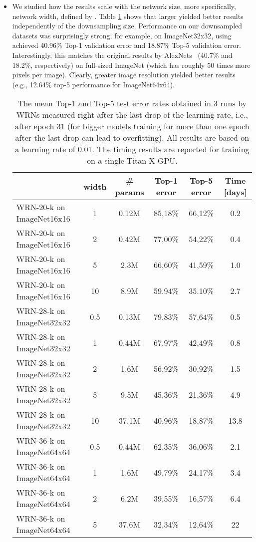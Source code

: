 \documentclass{article} \usepackage{iclr2017_conference,times}
\begin{document}
\begin{itemize}
	\item We studied how the results scale with the network size, more specifically, network width, defined by . Table \ref{Table1} shows that larger  yielded better results independently of the downsampling size.
Performance on our downsampled datasets was surprisingly strong; for example, on ImageNet32x32, using  achieved 40.96\% Top-1 validation error and 18.87\% Top-5 validation error. Interestingly, this matches the original results by AlexNets~\citep{krizhevsky2012imagenet} (40.7\% and 18.2\%, respectively) on full-sized ImageNet (which has roughly 50 times more pixels per image). Clearly, greater image resolution yielded better results (e.g., 12.64\% top-5 performance for ImageNet64x64).
    

\begin{table}[tbp]
\renewcommand{\arraystretch}{1.2}
\begin{center}
  \begin{tabular}{| l | c | c | c | c | c |}
    \hline
		& width  & \# params & Top-1 error & Top-5 error & Time [days] \\ \hline
		WRN-20-k on ImageNet16x16	& 1 &  0.12M &  85,18\% &  66,12\% & 0.2\\
		WRN-20-k on ImageNet16x16	& 2 &  0.42M &  77,00\% &  54,22\% & 0.4\\
		WRN-20-k on ImageNet16x16	& 5 &  2.3M &  66,60\% &  41,59\% & 1.0\\
		WRN-20-k on ImageNet16x16	& 10 &  8.9M &  59.94\% &  35.10\% & 2.7\\ \hline
		WRN-28-k on ImageNet32x32	& 0.5 &  0.13M &  79,83\% &  57,64\%  & 0.5\\
		WRN-28-k on ImageNet32x32	& 1 &  0.44M &  67,97\% &  42,49\%  & 0.8\\
        WRN-28-k on ImageNet32x32	& 2 &  1.6M &  56,92\% &  30,92\%  & 1.5\\
        WRN-28-k on ImageNet32x32	& 5 &  9.5M &  45,36\% &  21,36\%  & 4.9\\
        WRN-28-k on ImageNet32x32	& 10 &  37.1M &  40,96\% &  18,87\% & 13.8\\ \hline
        WRN-36-k on ImageNet64x64	& 0.5 &  0.44M &  62,35\%  &  36,06\% & 2.1\\
        WRN-36-k on ImageNet64x64	& 1 &  1.6M &  49,79\%  &  24,17\% &  3.4\\
        WRN-36-k on ImageNet64x64	& 2 &  6.2M &  39,55\% &  16,57\%  & 6.4\\
        WRN-36-k on ImageNet64x64	& 5 &  37.6M &  32,34\% &  12,64\%  & 22\\
    \hline
  \end{tabular}
\end{center}
\caption{The mean Top-1 and Top-5 test error rates obtained in 3 runs by WRNs measured right after the last drop of the learning rate, i.e., after epoch 31 (for bigger models training for more than one epoch after the last drop can lead to overfitting). All results are based on a learning rate of 0.01. The timing results are reported for training on a single Titan X GPU.}
\label{Table1}
\end{table}


\end{itemize}
\end{document}
